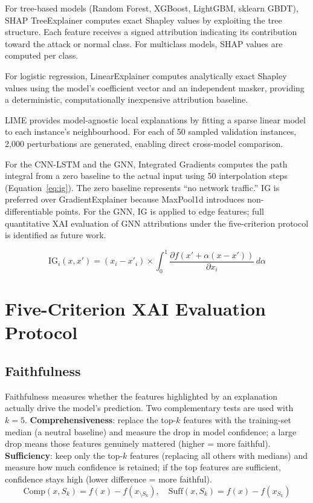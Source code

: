 \documentclass[12pt,a4paper]{report}
\begin{document}
For tree-based models (Random Forest, XGBoost, LightGBM, sklearn GBDT), SHAP TreeExplainer \cite{lundberg2020} computes exact Shapley values by exploiting the tree structure. Each feature receives a signed attribution indicating its contribution toward the attack or normal class. For multiclass models, SHAP values are computed per class.

For logistic regression, LinearExplainer computes analytically exact Shapley values using the model's coefficient vector and an independent masker, providing a deterministic, computationally inexpensive attribution baseline.

LIME \cite{ribeiro2016} provides model-agnostic local explanations by fitting a sparse linear model to each instance's neighbourhood. For each of 50 sampled validation instances, 2,000 perturbations are generated, enabling direct cross-model comparison.

For the CNN-LSTM and the GNN, Integrated Gradients \cite{sundararajan2017} computes the path integral from a zero baseline to the actual input using 50 interpolation steps (Equation~\ref{eq:ig}). The zero baseline represents ``no network traffic.'' IG is preferred over GradientExplainer because MaxPool1d introduces non-differentiable points. For the GNN, IG is applied to edge features; full quantitative XAI evaluation of GNN attributions under the five-criterion protocol is identified as future work.

\begin{equation}
\label{eq:ig}
\text{IG}_i(x, x') = (x_i - x'_i) \times \int_0^1 \frac{\partial f(x' + \alpha(x - x'))}{\partial x_i} \, d\alpha
\end{equation}

\section{Five-Criterion XAI Evaluation Protocol}
\label{sec:five-criterion}

\subsection{Faithfulness}
\label{sec:faithfulness}

Faithfulness measures whether the features highlighted by an explanation actually drive the model's prediction. Two complementary tests are used with $k = 5$. \textbf{Comprehensiveness}: replace the top-$k$ features with the training-set median (a neutral baseline) and measure the drop in model confidence; a large drop means those features genuinely mattered (higher = more faithful). \textbf{Sufficiency}: keep only the top-$k$ features (replacing all others with medians) and measure how much confidence is retained; if the top features are sufficient, confidence stays high (lower difference = more faithful).
\begin{equation}
\text{Comp}(x, S_k) = f(x) - f(x_{\setminus S_k}), \quad \text{Suff}(x, S_k) = f(x) - f(x_{S_k})
\end{equation}
\end{document}

